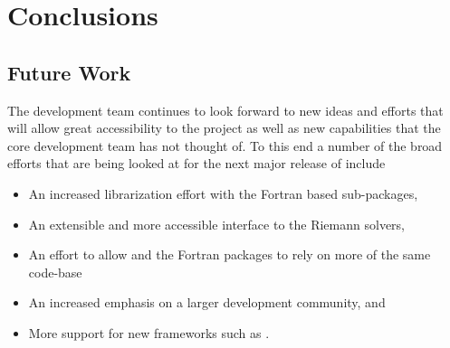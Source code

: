 %
%
%

\section{Conclusions} \label{sec:conclusions}


\subsection{Future Work} \label{sub:future}

The \clawpack development team continues to look forward to new ideas and
efforts that will allow great accessibility to the project as well as new
capabilities that the core development team has not thought of.  To this end a
number of the broad efforts that are being looked at for the next major release
of \clawpack include
\begin{itemize}
    \item An increased librarization effort with the Fortran based sub-packages,
    \item An extensible and more accessible interface to the Riemann solvers,
    \item An effort to allow \pyclaw and the \clawpack Fortran packages to rely
    on more of the same code-base
    \item An increased emphasis on a larger development community, and
    \item More support for new frameworks such as \forestclaw.
\end{itemize}
